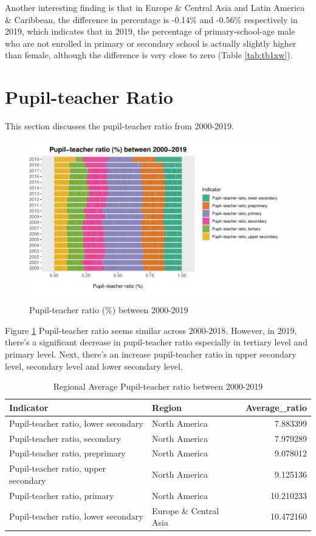 \documentclass[11pt,a4paper,]{article}
\begin{document}
Another interesting finding is that in Europe \& Central Asia and Latin America \& Caribbean, the difference in percentage is -0.14\% and -0.56\% respectively in 2019, which indicates that in 2019, the percentage of primary-school-age male who are not enrolled in primary or secondary school is actually slightly higher than female, although the difference is very close to zero (Table \ref{tab:tb1xw}).
\clearpage

\section*{Pupil-teacher Ratio}

This section discusses the pupil-teacher ratio from 2000-2019.

\begin{figure}
\centering
\includegraphics{report_files/figure-latex/Plot1-1.pdf}
\caption{\label{fig:Plot1}Pupil-teacher ratio (\%) between 2000-2019}
\end{figure}

Figure \ref{fig:Plot1} Pupil-teacher ratio seems similar across 2000-2018. However, in 2019, there's a significant decrease in pupil-teacher ratio especially in tertiary level and primary level. Next, there's an increase pupil-teacher ratio in upper secondary level, secondary level and lower secondary level.

\begin{table}[H]

\caption{\label{tab:Table2}Regional Average Pupil-teacher ratio between 2000-2019}
\centering
\begin{tabular}[t]{l|l|r}
\hline
Indicator & Region & Average\_ratio\\
\hline
Pupil-teacher ratio, lower secondary & North America & 7.883399\\
\hline
Pupil-teacher ratio, secondary & North America & 7.979289\\
\hline
Pupil-teacher ratio, preprimary & North America & 9.078012\\
\hline
Pupil-teacher ratio, upper secondary & North America & 9.125136\\
\hline
Pupil-teacher ratio, primary & North America & 10.210233\\
\hline
Pupil-teacher ratio, lower secondary & Europe \& Central Asia & 10.472160\\
\hline
\end{tabular}
\end{table}
\end{document}
